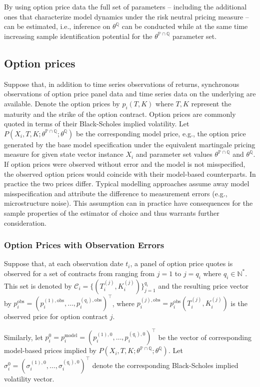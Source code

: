 \documentclass[11pt,a4paper,notitlepage]{article}
\numberwithin{equation}{section}
\begin{document}
By using option price data the full set of parameters -- including the additional ones that characterize model dynamics under the risk neutral pricing measure -- can be estimated, i.e., inference on $\theta^\mathbb{Q}$ can be conducted while at the same time increasing sample identification potential for the $\theta^{\mathbb{P} \cap \mathbb{Q}}$ parameter set. 

\subsection{Option prices}
Suppose that, in addition to time series observations of returns, synchronous observations of option price panel data and time series data on the underlying are available. Denote the option prices by $p_{i}(T,K)$ where $T,K$ represent the maturity and the strike of the option contract. Option prices are commonly quoted in terms of their Black-Scholes implied volatility. Let $P(X_{i},T,K; \theta^{\mathbb{P}\cap\mathbb{Q}}; \theta^\mathbb{Q})$ be the corresponding model price, e.g., the option price generated by the base model specification under the equivalent martingale pricing measure for  given state vector instance $X_{i}$ and parameter set values $\theta^{\mathbb{P}\cap\mathbb{Q}}$ and $\theta^\mathbb{Q}$. If option prices were observed without error and the model is not misspecified, the observed option prices would coincide with their model-based counterparts. In practice the two prices differ. Typical modelling approaches assume away model misspecification and attribute the difference to measurement errors (e.g., microstructure noise).  This assumption can in practice have consequences for the sample properties of the estimator of choice and thus warrants further consideration.

\subsubsection{Option Prices with Observation Errors}
Suppose that, at each observation date $t_i$, a panel of option price quotes is observed for a set of contracts from ranging from $j=1$ to $j=q_i$ where $q_i \in \mathbb{N}^*$. This set is denoted by $\mathcal{C}_i=\{(T_i^{(j)},K_i^{(j)})\}_{j=1}^{q_i}$ and the resulting price vector by
$p_i^{\mathrm{obs}}=\left(p_i^{(1),\mathrm{obs}},\dots,p_i^{(q_i),\mathrm{obs}}\right)^\top$, where $p_i^{(j),\mathrm{obs}}=p_i^{\mathrm{obs}}(T_i^{(j)},K_i^{(j)})$ is the observed price for option contract $j$.


Similarly, let $p_i^{0}=p_i^{\mathrm{model}}=\left(p_i^{(1),0},\dots,p_i^{(q_i),0}\right)^\top$
be the vector of corresponding model-based prices implied by
$P(X_i,T,K;\theta^{\mathbb{P}\cap\mathbb{Q}};\theta^\mathbb{Q})$. Let $\sigma_i^{0} = \left(\sigma_i^{(1),0},\dots,\sigma_i^{(q_i),0}\right)^\top$ denote the corresponding Black-Scholes implied volatility vector.
\end{document}

